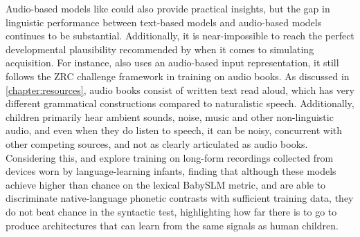 Audio-based models like \stela could also provide practical insights, but the gap in linguistic performance between text-based models and audio-based models continues to be substantial. Additionally, it is near-impossible to reach the perfect developmental plausibility recommended by \citet{dupoux-2018-cognitive} when it comes to simulating acquisition. For instance, also \stela uses an audio-based input representation, it still follows the ZRC challenge framework in training on audio books. As discussed in \cref{chapter:resources}, audio books consist of written text read aloud, which has very different grammatical constructions compared to naturalistic speech. Additionally, children primarily hear ambient sounds, noise, music and other non-linguistic audio, and even when they do listen to speech, it can be noisy, concurrent with other competing sources, and not as clearly articulated as audio books. Considering this, \citet{lavechin} and \citet{lavechin2024modeling} explore training \stela on long-form recordings collected from devices worn by language-learning infants, finding that although these models achieve higher than chance on the lexical BabySLM metric, and are able to discriminate native-language phonetic contrasts with sufficient training data, they do not beat chance in the syntactic test, highlighting how far there is to go to produce architectures that can learn from the same signals as human children.


